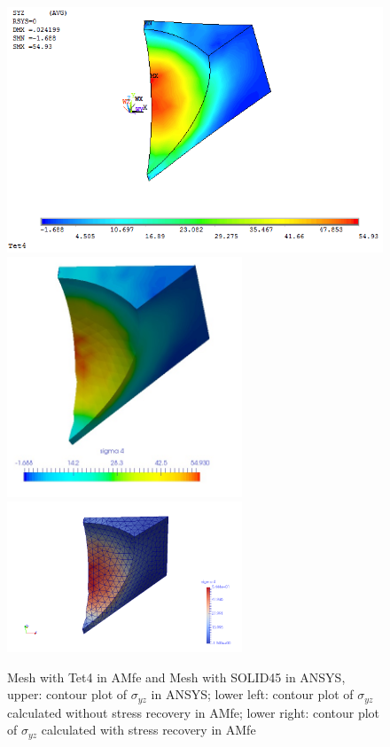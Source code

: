 \begin{figure}[htbp]
	\begin{center}
		\includegraphics[width=13cm,clip]{Tet4Syz.png} 
		\includegraphics[width=7cm,clip]{Tet4SyzPD.png} 			
		\includegraphics[width=7cm,clip]{Tet4SyzP.png} 		
		\caption{Mesh with Tet4 in AMfe and Mesh with SOLID45 in ANSYS, upper: contour plot of $\sigma_{yz}$ in ANSYS; lower left: contour plot of $\sigma_{yz}$ calculated without stress recovery in AMfe; lower right: contour plot of $\sigma_{yz}$ calculated with stress recovery in AMfe} \label{fig: Tet4_Syz}
	\end{center}
\end{figure}
\clearpage 

